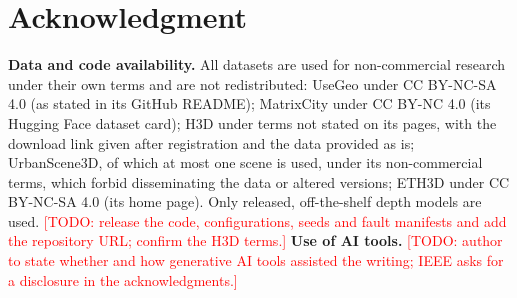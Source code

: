 \documentclass[letterpaper,journal,twoside]{IEEEtran}
\begin{document}
\IEEEpeerreviewmaketitle







\label{endmaintext}

\section*{Acknowledgment}
\textbf{Data and code availability.} All datasets are used for non-commercial research under their own
terms and are not redistributed: UseGeo under CC BY-NC-SA 4.0 (as stated in its GitHub README);
MatrixCity under CC BY-NC 4.0 (its Hugging Face dataset card); H3D under terms not stated on its pages,
with the download link given after registration and the data provided as is; UrbanScene3D, of which at
most one scene is used, under its non-commercial terms, which forbid disseminating the data or altered
versions; ETH3D under CC BY-NC-SA 4.0 (its home page). Only released, off-the-shelf depth models are used.
\textcolor{red}{[TODO: release the code, configurations, seeds and fault manifests and add the repository URL; confirm the H3D terms.]}
\textbf{Use of AI tools.} \textcolor{red}{[TODO: author to state whether and how generative AI tools assisted the writing; IEEE asks for a disclosure in the acknowledgments.]}



\end{document}
